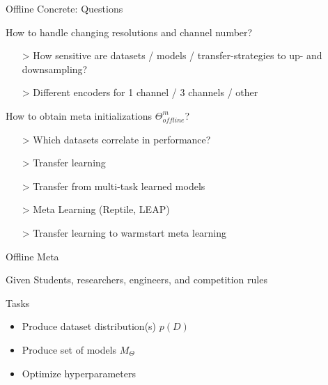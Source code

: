 \documentclass[aspectratio=169,12pt,handout]{beamer}
\begin{document}
\begin{frame}{Offline Concrete: Questions}



\begin{itemizebig}
    \item How to handle changing resolutions and channel number?
    \begin{itemize}
        \item[>] How sensitive are datasets / models / transfer-strategies to up- and downsampling?
        \item[>] Different encoders for 1 channel / 3 channels / other
    \end{itemize}

    \item<2> How to obtain meta initializations $\Theta_{offline}^m$?
    \begin{itemize}
        \item[>] Which datasets correlate in performance?
        \item[>] Transfer learning
        \item[>] Transfer from multi-task learned models
        \item[>] Meta Learning (Reptile, LEAP)
        \item[>] Transfer learning to warmstart meta learning
    \end{itemize}
\end{itemizebig}

\end{frame}





\begin{frame}{Offline Meta}

\begin{block}{Given}
Students, researchers, engineers, and competition rules
\end{block}

\begin{block}{Tasks}
    \begin{itemize}
        \item Produce dataset distribution(s) $p(D)$
        \item Produce set of models $M_\Theta$
        \item Optimize hyperparameters
    \end{itemize}
\end{block}


\end{frame}
\end{document}
